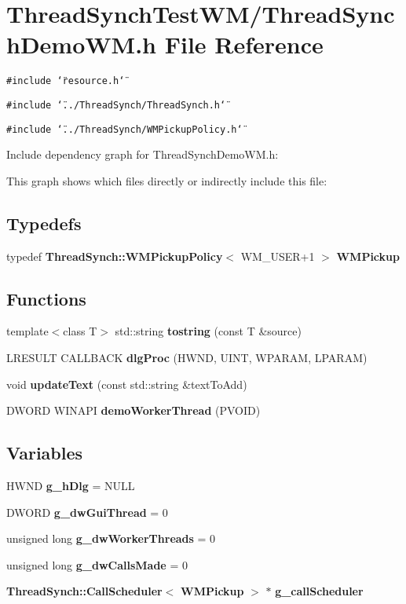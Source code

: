 \section{Thread\-Synch\-Test\-WM/Thread\-Synch\-Demo\-WM.h File Reference}
\label{_thread_synch_demo_w_m_8h}
{\tt \#include \char`\"{}resource.h\char`\"{}}\par
{\tt \#include \char`\"{}../Thread\-Synch/Thread\-Synch.h\char`\"{}}\par
{\tt \#include \char`\"{}../Thread\-Synch/WMPickup\-Policy.h\char`\"{}}\par


Include dependency graph for Thread\-Synch\-Demo\-WM.h:

This graph shows which files directly or indirectly include this file:\subsection*{Typedefs}
\begin{CompactItemize}
\item 
typedef {\bf Thread\-Synch::WMPickup\-Policy}$<$ WM\_\-USER+1 $>$ {\bf WMPickup}
\end{CompactItemize}
\subsection*{Functions}
\begin{CompactItemize}
\item 
template$<$class T$>$ std::string {\bf tostring} (const T \&source)
\item 
LRESULT CALLBACK {\bf dlg\-Proc} (HWND, UINT, WPARAM, LPARAM)
\item 
void {\bf update\-Text} (const std::string \&text\-To\-Add)
\item 
DWORD WINAPI {\bf demo\-Worker\-Thread} (PVOID)
\end{CompactItemize}
\subsection*{Variables}
\begin{CompactItemize}
\item 
HWND {\bf g\_\-h\-Dlg} = NULL
\item 
DWORD {\bf g\_\-dw\-Gui\-Thread} = 0
\item 
unsigned long {\bf g\_\-dw\-Worker\-Threads} = 0
\item 
unsigned long {\bf g\_\-dw\-Calls\-Made} = 0
\item 
{\bf Thread\-Synch::Call\-Scheduler}$<$ {\bf WMPickup} $>$ $\ast$ {\bf g\_\-call\-Scheduler}
\end{CompactItemize}


